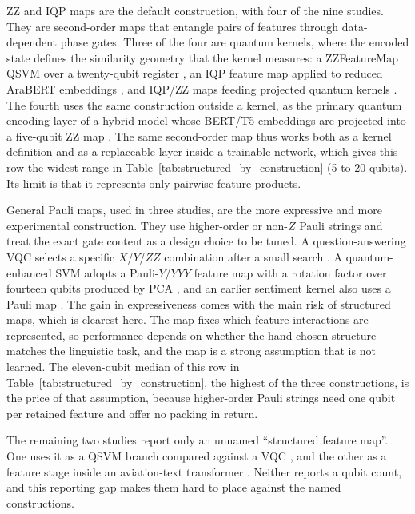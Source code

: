 \documentclass{ieeeaccess}
\begin{document}
ZZ and IQP maps are the default construction, with four of the nine studies. They are second-order maps that entangle pairs of features through data-dependent phase gates.
Three of the four are quantum kernels, where the encoded state defines the similarity geometry that the kernel measures: a ZZFeatureMap QSVM over a twenty-qubit register \cite{widdows_near-term_2024}, an IQP feature map applied to reduced AraBERT embeddings \cite{djemmal_arabert-qc_2025}, and IQP/ZZ maps feeding projected quantum kernels \cite{keith-norambuena_quantum_2026}. The fourth uses the same construction outside a kernel, as the primary quantum encoding layer of a hybrid model whose BERT/T5 embeddings are projected into a five-qubit ZZ map \cite{baik_neural_2025}.
The same second-order map thus works both as a kernel definition and as a replaceable layer inside a trainable network, which gives this row the widest range in Table~\ref{tab:structured_by_construction} (5 to 20 qubits). Its limit is that it represents only pairwise feature products.

General Pauli maps, used in three studies, are the more expressive and more experimental construction. They use higher-order or non-$Z$ Pauli strings and treat the exact gate content as a design choice to be tuned.
A question-answering VQC selects a specific $X$/$Y$/$ZZ$ combination after a small search \cite{katyayan_supervised_2023}. A quantum-enhanced SVM adopts a Pauli-$Y$/$YYY$ feature map with a rotation factor over fourteen qubits produced by PCA \cite{ruskanda_quantum-enhanced_2023}, and an earlier sentiment kernel also uses a Pauli map \cite{mohammad_masum_hybrid_2023}.
The gain in expressiveness comes with the main risk of structured maps, which is clearest here. The map fixes which feature interactions are represented, so performance depends on whether the hand-chosen structure matches the linguistic task, and the map is a strong assumption that is not learned. The eleven-qubit median of this row in Table~\ref{tab:structured_by_construction}, the highest of the three constructions, is the price of that assumption, because higher-order Pauli strings need one qubit per retained feature and offer no packing in return.

The remaining two studies report only an unnamed ``structured feature map''.
One uses it as a QSVM branch compared against a VQC \cite{sunkavalli_experimentation_2024}, and the other as a feature stage inside an aviation-text transformer \cite{jagatheesan_quantum_2026}.
Neither reports a qubit count, and this reporting gap makes them hard to place against the named constructions.
\end{document}
